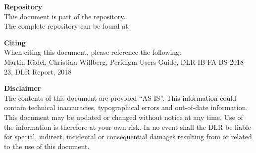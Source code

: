 {  \vspace{3em}
  
  \begin{minipage}{0.7\linewidth}
    {\bfseries Repository}\\%
    This document is part of the \reponame{} repository.\\
    The complete repository can be found at:
    
    \href{\repoaddress}{\repoaddress}
  \end{minipage}
  \begin{minipage}{0.29\linewidth}
    \centering
    \centering
    {%
      \hypersetup{colorlinks=false,linkcolor=black}
      \repoqrcode
    }
  \end{minipage}
  
  \vspace{3em}
  
  \begin{minipage}{\linewidth}
    {\bfseries Citing}\\%
    When citing this document, please reference the following:\\
    Martin R{\"a}del, Christian Willberg, Peridigm Users Guide, DLR-IB-FA-BS-2018-23, DLR Report, 2018
  \end{minipage}
  
  \vfill
  
  {\bfseries Disclaimer}\\%
  The contents of this document are provided ``AS IS''.  This information could contain technical inaccuracies, typographical errors and out-of-date information. This document may be updated or changed without notice at any time. Use of the information is therefore at your own risk. In no event shall the DLR be liable for special, indirect, incidental or consequential damages resulting from or related to the use of this document.
}
\makeatother
